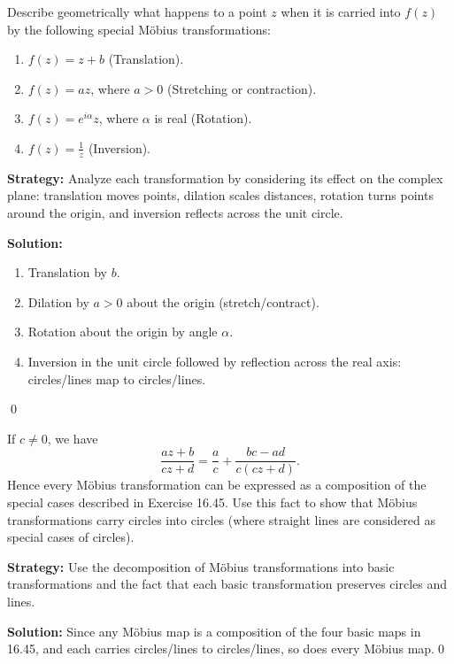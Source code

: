\begin{problembox}
Describe geometrically what happens to a point \( z \) when it is carried into \( f(z) \) by the following special Möbius transformations:
\begin{enumerate}[label=(\alph*)]
\item \( f(z) = z + b \) (Translation).
\item \( f(z) = a z \), where \( a > 0 \) (Stretching or contraction).
\item \( f(z) = e^{i \alpha} z \), where \( \alpha \) is real (Rotation).
\item \( f(z) = \frac{1}{z} \) (Inversion).
\end{enumerate}
\end{problembox}

\noindent\textbf{Strategy:} Analyze each transformation by considering its effect on the complex plane: translation moves points, dilation scales distances, rotation turns points around the origin, and inversion reflects across the unit circle.

\bigskip\noindent\textbf{Solution:}
\begin{enumerate}[label=(\alph*)]
\item Translation by $b$.
\item Dilation by $a>0$ about the origin (stretch/contract).
\item Rotation about the origin by angle $\alpha$.
\item Inversion in the unit circle followed by reflection across the real axis: circles/lines map to circles/lines.
\end{enumerate}\qed


\begin{problembox}
If \( c \neq 0 \), we have
\[ \frac{a z + b}{c z + d} = \frac{a}{c} + \frac{b c - a d}{c (c z + d)}. \]
Hence every Möbius transformation can be expressed as a composition of the special cases described in Exercise 16.45. Use this fact to show that Möbius transformations carry circles into circles (where straight lines are considered as special cases of circles).
\end{problembox}

\noindent\textbf{Strategy:} Use the decomposition of Möbius transformations into basic transformations and the fact that each basic transformation preserves circles and lines.

\bigskip\noindent\textbf{Solution:}
Since any Möbius map is a composition of the four basic maps in 16.45, and each carries circles/lines to circles/lines, so does every Möbius map.\qed


